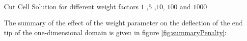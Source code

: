 \documentclass[a4paper,12pt]{article}
\makeatletter
\newenvironment{figurehere}
  {\def\@captype{figure}}
  {}
\makeatother
\begin{document}
\begin{center}
\begin{figurehere}
\\
\caption{Cut Cell Solution for different weight factors $1$ ,$5$ ,$10$, $100$ and $1000$}\label{fig:withcontDE}
\end{figurehere}
\end{center}
The summary of the effect of the weight parameter on the deflection of the end tip of the one-dimensional domain is given in figure \ref{fig:summaryPenalty}:
\end{document}
